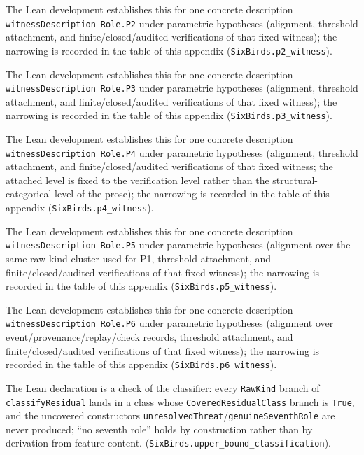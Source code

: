 \begin{description}[style=unboxed,leftmargin=0pt,itemsep=3pt]
  \item[Proposition~\ref{prop:p2-witness}.] The Lean development establishes this for one concrete description \texttt{witnessDescription}\allowbreak\ \texttt{Role.P2} under parametric hypotheses (alignment, threshold attachment, and finite/\allowbreak closed/\allowbreak audited verifications of that fixed witness); the narrowing is recorded in the table of this appendix (\texttt{SixBirds.p2\_witness}).
  \item[Proposition~\ref{prop:p3-witness}.] The Lean development establishes this for one concrete description \texttt{witnessDescription}\allowbreak\ \texttt{Role.P3} under parametric hypotheses (alignment, threshold attachment, and finite/\allowbreak closed/\allowbreak audited verifications of that fixed witness); the narrowing is recorded in the table of this appendix (\texttt{SixBirds.p3\_witness}).
  \item[Proposition~\ref{prop:p4-witness}.] The Lean development establishes this for one concrete description \texttt{witnessDescription}\allowbreak\ \texttt{Role.P4} under parametric hypotheses (alignment, threshold attachment, and finite/\allowbreak closed/\allowbreak audited verifications of that fixed witness; the attached level is fixed to the verification level rather than the structural-categorical level of the prose); the narrowing is recorded in the table of this appendix (\texttt{SixBirds.p4\_witness}).
  \item[Proposition~\ref{prop:p5-witness}.] The Lean development establishes this for one concrete description \texttt{witnessDescription}\allowbreak\ \texttt{Role.P5} under parametric hypotheses (alignment over the same raw-kind cluster used for P1, threshold attachment, and finite/\allowbreak closed/\allowbreak audited verifications of that fixed witness); the narrowing is recorded in the table of this appendix (\texttt{SixBirds.p5\_witness}).
  \item[Proposition~\ref{prop:p6-witness}.] The Lean development establishes this for one concrete description \texttt{witnessDescription}\allowbreak\ \texttt{Role.P6} under parametric hypotheses (alignment over event/\allowbreak provenance/\allowbreak replay/\allowbreak check records, threshold attachment, and finite/\allowbreak closed/\allowbreak audited verifications of that fixed witness); the narrowing is recorded in the table of this appendix (\texttt{SixBirds.p6\_witness}).
  \item[Theorem~\ref{thm:upper-bound-classification}.] The Lean declaration is a check of the classifier: every \texttt{RawKind} branch of \texttt{classifyResidual} lands in a class whose \texttt{CoveredResidualClass} branch is \texttt{True}, and the uncovered constructors \texttt{unresolvedThreat}/\allowbreak\texttt{genuineSeventhRole} are never produced; ``no seventh role'' holds by construction rather than by derivation from feature content. (\texttt{SixBirds.upper\_bound\_classification}).

\end{description}
